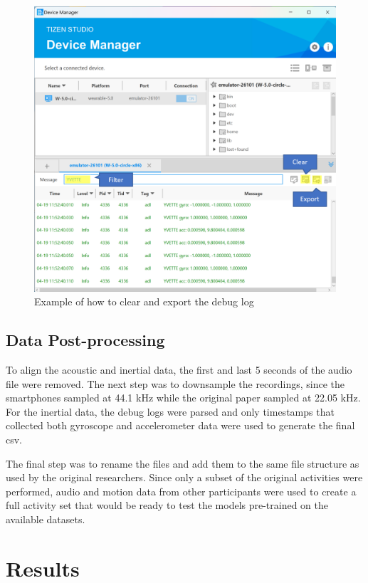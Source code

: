 \documentclass[conference]{IEEEtran}
\begin{document}
	\begin{figure}[h]
		\centering
		\includegraphics[scale=0.60]{DeviceManager}
		\caption{Example of how to clear and export the debug log}
		\label{fig: DeviceManager}
	\end{figure}
	
	\subsection{Data Post-processing}
	To align the acoustic and inertial data, the first and last 5 seconds of the audio file were removed.
	The next step was to downsample the recordings, since the smartphones sampled at 44.1 kHz while the original paper sampled at 22.05 kHz.
	For the inertial data, the debug logs were parsed and only timestamps that collected both gyroscope and accelerometer data were used to generate the final csv.
	
	The final step was to rename the files and add them to the same file structure as used by the original researchers.
	Since only a subset of the original activities were performed, audio and motion data from other participants were used to create a full activity set that would be ready to test the models pre-trained on the available datasets.
	
	\section{Results}
\end{document}
